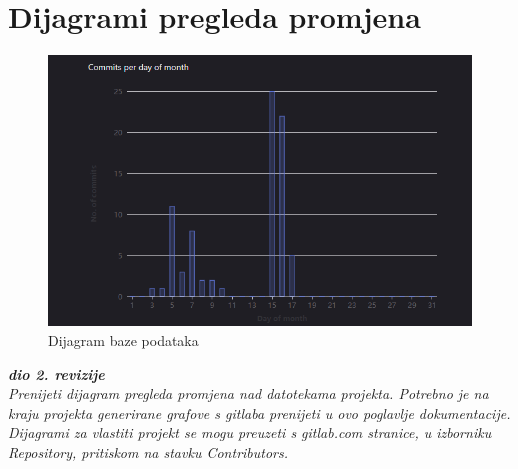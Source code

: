 		\section*{Dijagrami pregleda promjena}
		\begin{figure}[H]
			\includegraphics[scale=0.7]{slike/Aktivnost.png}
			\centering
			\caption{Dijagram baze podataka}
			\label{fig:promjene}
		          \end{figure}
		\textbf{\textit{dio 2. revizije}}\\
		
		\textit{Prenijeti dijagram pregleda promjena nad datotekama projekta. Potrebno je na kraju projekta generirane grafove s gitlaba prenijeti u ovo poglavlje dokumentacije. Dijagrami za vlastiti projekt se mogu preuzeti s gitlab.com stranice, u izborniku Repository, pritiskom na stavku Contributors.}
		
	